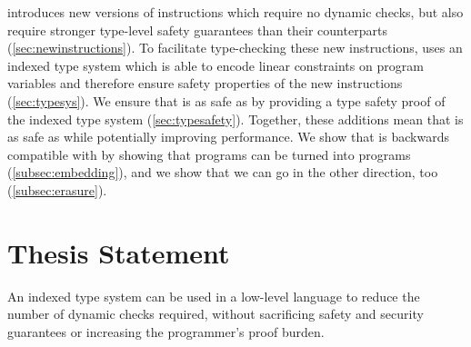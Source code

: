 \name introduces new versions of \wasm instructions which require no dynamic checks, but also require stronger type-level safety guarantees than their \wasm counterparts (\autoref{sec:newinstructions}).
To facilitate type-checking these new instructions, \name uses an indexed type system which is able to encode linear constraints on program variables and therefore ensure safety properties of the new \name instructions (\autoref{sec:typesys}).
We ensure that \name is as safe as \wasm by providing a type safety proof of the \name indexed type system (\autoref{sec:typesafety}).
Together, these additions mean that \name is as safe as \wasm while potentially improving performance.
We show that \name is backwards compatible with \wasm by showing that \wasm programs can be turned into \name programs (\autoref{subsec:embedding}), and we show that we can go in the other direction, too (\autoref{subsec:erasure}).

\section{Thesis Statement}
\begin{adjustwidth}{1cm}{1cm}
    An indexed type system can be used in a low-level language to reduce the number of dynamic checks required, without sacrificing safety and security guarantees or increasing the programmer's proof burden.
\end{adjustwidth}
